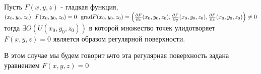 \begin{theorem}
  Пусть $F(x,y,z)$ - гладкая функция, $(x_0, y_0, z_0) ~~ F(x_0, y_0, z_0) = 0
  ~~ \mathrm{grad} F(x_0, y_0, z_0) = \left(
  \frac{\partial F}{\partial x}(x_0, y_0, z_0),
  \frac{\partial F}{\partial y}(x_0, y_0, z_0),
  \frac{\partial F}{\partial z}(x_0, y_0, z_0)
  \right) \not= 0$ тогда $\exists O(U(x_0, y_0, z_0))$ в которой множество
  точек улидотворяет $F(x, y, z) = 0$ является образом регулярной поверхности.

  В этом случае мы будем говорит ьчто эта регулярная поверхность задана
  уравнением $F(x, y, z) = 0$
\end{theorem}